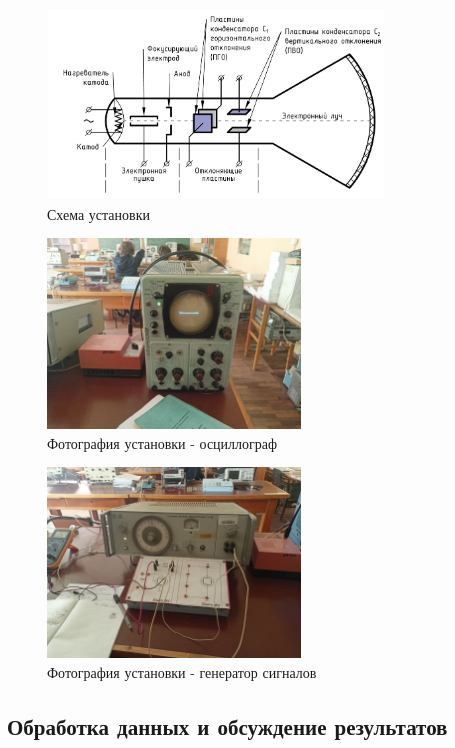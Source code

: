\begin{figure}[ht!]
\centering
\includegraphics[width=0.8\textwidth]{3_Осцилограф-Лист1.jpg}
\caption{Схема установки}
\label{fig:sketch}
\end{figure}

\begin{figure}[H]
\centering
\includegraphics[width=0.6\textwidth]{1.jpg}
\caption{Фотография установки - осциллограф}
\label{fig:device}
\end{figure}

\begin{figure}[H]
\centering
\includegraphics[width=0.6\textwidth]{2.jpg}
\caption{Фотография установки - генератор сигналов}
\label{fig:device}
\end{figure}


\subsection{Обработка данных и обсуждение результатов}

